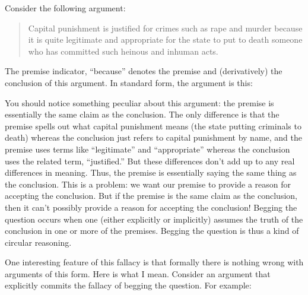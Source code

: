 Consider the following argument:
\begin{quote}
Capital punishment is justified for crimes such as rape and murder because it is quite legitimate and appropriate for the state to put to death someone who has committed such heinous and inhuman acts.
\end{quote}


The premise indicator, ``because'' denotes the premise and (derivatively) the conclusion of this argument. In standard form, the argument is this:

\begin{kormanize}
\end{kormanize}

You should notice something peculiar about this argument: the premise is essentially the same claim as the conclusion. The only difference is that the premise spells out what capital punishment means (the state putting criminals to death) whereas the conclusion just refers to capital punishment by name, and the premise uses terms like ``legitimate'' and ``appropriate'' whereas the conclusion uses the related term, ``justified.'' But these differences don't add up to any real differences in meaning. Thus, the premise is essentially saying the same thing as the conclusion. This is a problem: we want our premise to provide a reason for accepting the conclusion. But if the premise is the same claim as the conclusion, then it can't possibly provide a reason for accepting the conclusion! Begging the question occurs when one (either explicitly or implicitly) assumes the truth of the conclusion in one or more of the premises. Begging the question is thus a kind of circular reasoning.

One interesting feature of this fallacy is that formally there is nothing wrong with arguments of this form. Here is what I mean. Consider an argument that explicitly commits the fallacy of begging the question. For example:
\begin{kormanize}
\end{kormanize}

